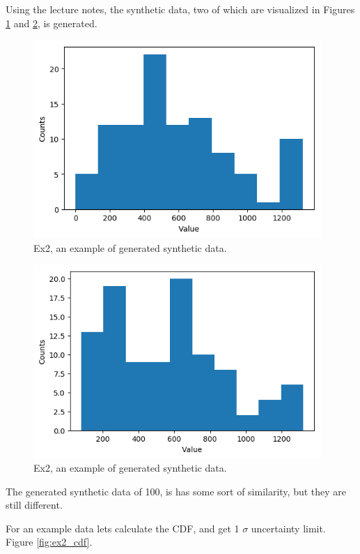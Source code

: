 \documentclass{article}
\begin{document}
Using the lecture notes, the synthetic data, two of which are visualized in Figures \ref{fig:ex2_synt1} and \ref{fig:ex2_synt2}, is generated.
\begin{figure}[!hbt]
	\centering
	\includegraphics[width=4.3in]{ex2_synt1}
	\caption{Ex2, an example of generated synthetic data.}
	\label{fig:ex2_synt1}
\end{figure}

\begin{figure}[!hbt]
	\centering
	\includegraphics[width=4.3in]{ex2_synt2}
	\caption{Ex2, an example of generated synthetic data.}
	\label{fig:ex2_synt2}
\end{figure}

The generated synthetic data of 100, is has some sort of similarity, but they are still different.


For an example data lets calculate the CDF, and get 1 $\sigma$ uncertainty limit. Figure \ref{fig:ex2_cdf}.
\end{document}
